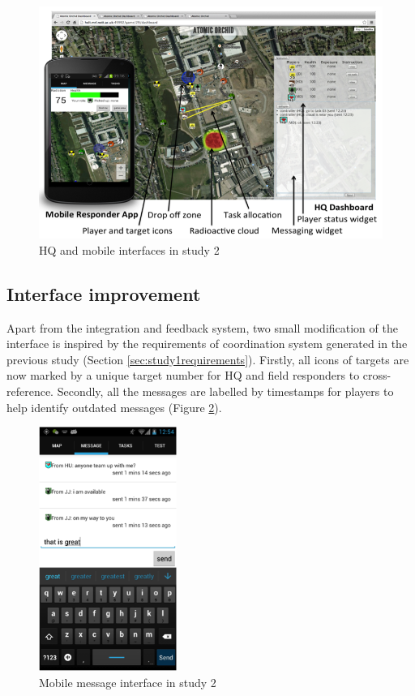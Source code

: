 \begin{figure}[h]
  \centering
  \includegraphics[width=1\textwidth]{img/study2/system/HQ}
  \caption{HQ and mobile interfaces in study 2}
  \label{fig:study2HQ}
\end{figure}


\subsection{Interface improvement}
Apart from the integration and feedback system, two small modification of the interface is inspired by the requirements of coordination system generated in the previous study (Section \ref{sec:study1requirements}). Firstly, all icons of targets are now marked by a unique target number for HQ and field responders to cross-reference. Secondly, all the messages are labelled by timestamps for players to help identify outdated messages (Figure \ref{fig:study2mobilemsg}).\\

\begin{figure}[h]
  \centering
  \includegraphics[width=0.4\textwidth]{img/study2/system/mobilemsg}
  \caption{Mobile message interface in study 2}
  \label{fig:study2mobilemsg}
\end{figure}

